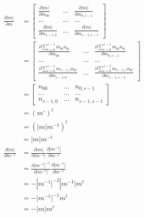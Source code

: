 \documentclass[runningheads,openany]{xhlPaper}
\begin{document}
\begin{equation}
\label{equ:matrixDetDerivation}
\begin{aligned}
\frac{{\partial |m|}}{{\partial m}} &= \left[ {\begin{array}{*{20}{c}}
{\frac{{\partial |m|}}{{\partial {m_{00}}}}}&{...}&{\frac{{\partial |m|}}{{\partial {m_{0,s - 1}}}}}\\
{...}&{...}&{...}\\
{\frac{{\partial |m|}}{{\partial {m_{s - 1,0}}}}}&{...}&{\frac{{\partial |m|}}{{\partial {m_{s - 1,s - 1}}}}}
\end{array}} \right]\\
 &= \left[ {\begin{array}{*{20}{c}}
{\frac{{\partial \sum\limits_{i = 0}^{s - 1} {{m_{0i}}{n_{0i}}} }}{{\partial {m_{00}}}}}&{...}&{\frac{{\partial \sum\limits_{i = 0}^{s - 1} {{m_{0i}}{n_{0i}}} }}{{\partial {m_{0,s - 1}}}}}\\
{...}&{...}&{...}\\
{\frac{{\partial \sum\limits_{i = 0}^{s - 1} {{m_{s - 1,i}}{n_{0i}}} }}{{\partial {m_{s - 1,0}}}}}&{...}&{\frac{{\partial \sum\limits_{i = 0}^{s - 1} {{m_{s - 1,i}}{n_{0i}}} }}{{\partial {m_{s - 1,s - 1}}}}}
\end{array}} \right]\\
 &= \left[ {\begin{array}{*{20}{c}}
{{n_{00}}}&{...}&{{n_{0,s - 1}}}\\
{...}&{...}&{...}\\
{{n_{s - 1,0}}}&{...}&{{n_{s - 1,s - 1}}}
\end{array}} \right]\\
 &= {\left( {{m^ \circ }} \right)^t}\\
 &= {\left( {|m|{m^{ - 1}}} \right)^t}\\
 &= |m|{m^{ - t}}\\
\frac{{\partial |m|}}{{\partial {m^{ - 1}}}} &= \frac{{\partial |m|}}{{\partial |{m^{ - 1}}|}}\frac{{\partial |{m^{ - 1}}|}}{{\partial {m^{ - 1}}}}\\
 &= \frac{{\partial |{m^{ - 1}}{|^{ - 1}}}}{{\partial |{m^{ - 1}}|}}\frac{{\partial |{m^{ - 1}}|}}{{\partial {m^{ - 1}}}}\\
 &=  - |{m^{ - 1}}{|^{ - 2}}|{m^{ - 1}}|{m^t}\\
 &=  - |{m^{ - 1}}{|^{ - 1}}{m^t}\\
 &=  - |m|{m^t}
\end{aligned}
\end{equation}
\end{document}
